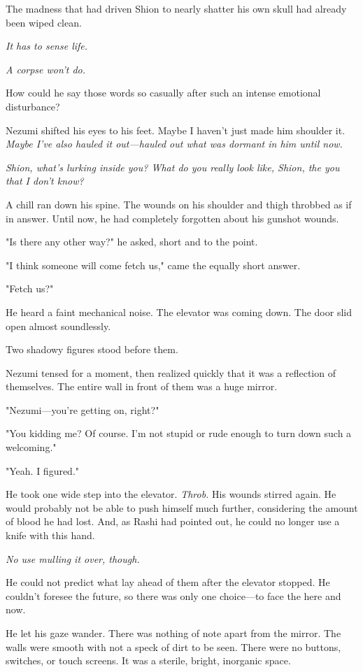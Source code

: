 The madness that had driven Shion to nearly shatter his own skull had
already been wiped clean.

\emph{It has to sense life.}

\emph{A corpse won't do.}

How could he say those words so casually after such an intense emotional
disturbance?

Nezumi shifted his eyes to his feet. Maybe I haven't just made him
shoulder it. \emph{Maybe I've also hauled it out---hauled out what was dormant
in him until now.}

\emph{Shion, what's lurking inside you? What do you really look like, Shion,
the you that I don't know?}

A chill ran down his spine. The wounds on his shoulder and thigh
throbbed as if in answer. Until now, he had completely forgotten about
his gunshot wounds.

"Is there any other way?" he asked, short and to the point.

"I think someone will come fetch us," came the equally short answer.

"Fetch us?"

He heard a faint mechanical noise. The elevator was coming down. The
door slid open almost soundlessly.

Two shadowy figures stood before them.

Nezumi tensed for a moment, then realized quickly that it was a
reflection of themselves. The entire wall in front of them was a huge
mirror.

"Nezumi---you're getting on, right?"

"You kidding me? Of course. I'm not stupid or rude enough to turn down
such a welcoming."

"Yeah. I figured."

He took one wide step into the elevator. \emph{Throb.} His wounds stirred
again. He would probably not be able to push himself much further,
considering the amount of blood he had lost. And, as Rashi had pointed
out, he could no longer use a knife with this hand.

\emph{No use mulling it over, though.}

He could not predict what lay ahead of them after the elevator stopped.
He couldn't foresee the future, so there was only one choice---to face the
here and now.

He let his gaze wander. There was nothing of note apart from the mirror.
The walls were smooth with not a speck of dirt to be seen. There were no
buttons, switches, or touch screens. It was a sterile, bright, inorganic
space.

